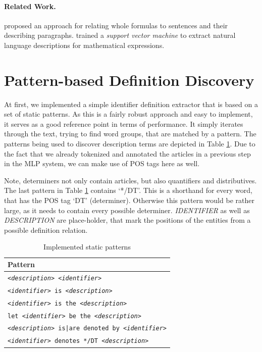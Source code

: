 \documentclass[runningheads]{llncs}
\begin{document}
\paragraph{Related Work.}

\citeauthor{Quoc2010} \cite{Quoc2010} proposed an approach for
relating whole formulas to sentences and their describing paragraphs.
\citeauthor{Yokoi} \cite{Yokoi} trained a \emph{support vector machine} to extract
natural language descriptions for mathematical expressions.

\section{Pattern-based Definition Discovery}

At first, we implemented a simple identifier definition extractor that is
based on a set of static patterns. As this is a fairly robust approach and easy
to implement, it serves as a good reference point in terms of
performance. It simply iterates through the text, trying to find word groups,
that are matched by a pattern. The patterns being used to discover description
terms are depicted in Table \ref{tpatterns}. Due to the fact that we already
tokenized and annotated the articles in a previous step in the MLP system, we
can make use of POS tags here as well.

Note, determiners not only contain articles, but also quantifiers and
distributives. The last pattern in Table \ref{tpatterns} contains `*/DT'. This
is a shorthand for every word, that has the POS tag `DT' (determiner).
Otherwise this pattern would be rather large, as it needs to contain every
possible determiner. \emph{IDENTIFIER} as well as \emph{DESCRIPTION} are
place-holder, that mark the positions of the entities from a possible definition
relation.

\begin{table}
\vspace{-5pt}
	\begin{center}
		\begin{tabular}{| p{9.3cm} |}
			\hline
			Pattern \\
			\hline
			\texttt{\emph{<description>} \emph{<identifier>}} \\
			\texttt{\emph{<identifier>} is \emph{<description>}} \\
			\texttt{\emph{<identifier>} is the \emph{<description>}} \\
			\texttt{let \emph{<identifier>} be the \emph{<description>}} \\
			\texttt{\emph{<description>} is|are denoted by \emph{<identifier>}} \\
			\texttt{\emph{<identifier>} denotes */DT \emph{<description>}} \\
			\hline
		\end{tabular}
	\end{center}
\caption{\label{tpatterns}Implemented static patterns}
\vspace{-5pt}
\end{table}
\end{document}
